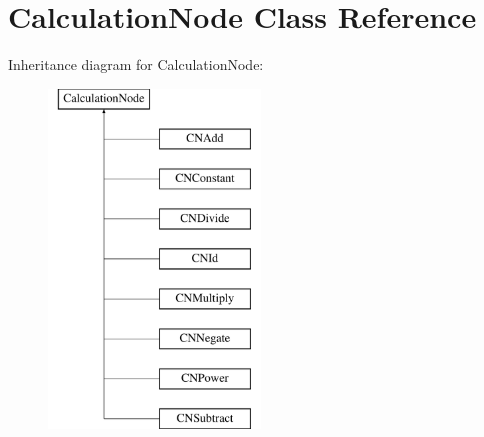 \hypertarget{classCalculationNode}{}\section{Calculation\+Node Class Reference}
\label{classCalculationNode}
Inheritance diagram for Calculation\+Node\+:\begin{figure}[H]
\begin{center}
\leavevmode
\includegraphics[height=9.000000cm]{classCalculationNode}
\end{center}
\end{figure}
